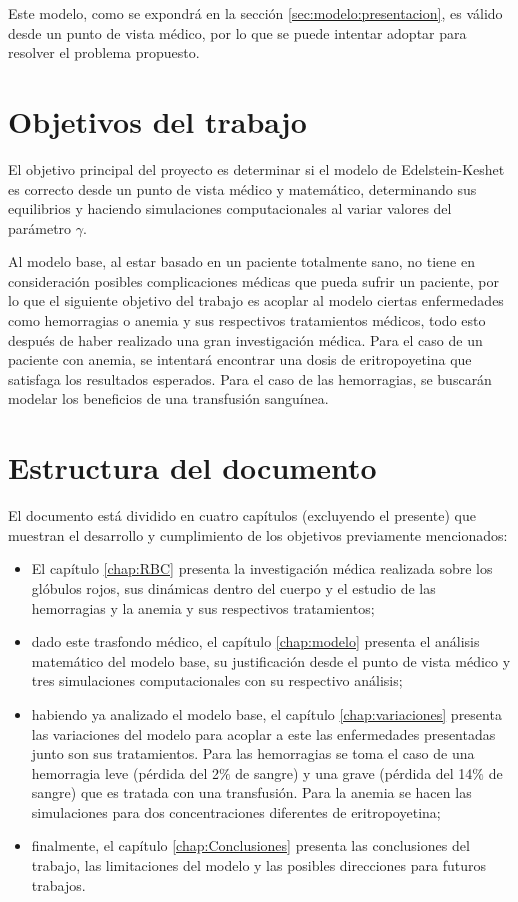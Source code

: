 Este modelo, como se expondrá en la sección \ref{sec:modelo:presentacion}, es válido desde un punto de vista médico, por lo que se puede intentar adoptar para resolver el problema propuesto. 

\section{Objetivos del trabajo}

El objetivo principal del proyecto es determinar si el modelo de Edelstein-Keshet es correcto desde un punto de vista médico y matemático, determinando sus equilibrios y haciendo simulaciones computacionales al variar valores del parámetro $\gamma$.

Al modelo base, al estar basado en un paciente totalmente sano, no tiene en consideración posibles complicaciones médicas que pueda sufrir un paciente, por lo que el siguiente objetivo del trabajo es acoplar al modelo ciertas enfermedades como hemorragias o anemia y sus respectivos tratamientos médicos, todo esto después de haber realizado una gran investigación médica. Para el caso de un paciente con anemia, se intentará encontrar una dosis de eritropoyetina que satisfaga los resultados esperados. Para el caso de las hemorragias, se buscarán modelar los beneficios de una transfusión sanguínea.

\section{Estructura del documento}

El documento está dividido en cuatro capítulos (excluyendo el presente) que muestran el desarrollo y cumplimiento de los objetivos previamente mencionados:

\begin{itemize}
    \item El capítulo \ref{chap:RBC} presenta la investigación médica realizada sobre los glóbulos rojos, sus dinámicas dentro del cuerpo y el estudio de las hemorragias y la anemia y sus respectivos tratamientos;
    \item dado este trasfondo médico, el capítulo \ref{chap:modelo} presenta el análisis matemático del modelo base, su justificación desde el punto de vista médico y tres simulaciones computacionales con su respectivo análisis;
    \item habiendo ya analizado el modelo base, el capítulo \ref{chap:variaciones} presenta las variaciones del modelo para acoplar a este las enfermedades presentadas junto son sus tratamientos. Para las hemorragias se toma el caso de una hemorragia leve (pérdida del 2$\%$ de sangre) y una grave (pérdida del 14$\%$ de sangre) que es tratada con una transfusión. Para la anemia se hacen las simulaciones para dos concentraciones diferentes de eritropoyetina;
    \item finalmente, el capítulo \ref{chap:Conclusiones} presenta las conclusiones del trabajo, las limitaciones del modelo y las posibles direcciones para futuros trabajos.
\end{itemize}